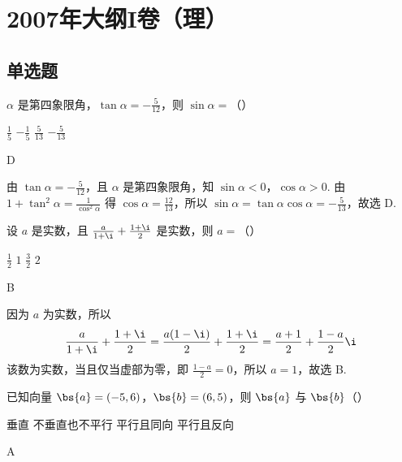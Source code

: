 \chapter{2007年大纲I卷（理）}

\section{单选题}

\begin{problem}
\(\alpha\) 是第四象限角，\(\tan \alpha = -\frac{5}{12}\)，则 \(\sin \alpha =\)（\quad）

\choices
    {\(\frac{1}{5}\)}
    {\(-\frac{1}{5}\)}
    {\(\frac{5}{13}\)}
    {\(-\frac{5}{13}\)}
\end{problem}

\begin{answer}
D
\end{answer}

\begin{solution}
由 \(\tan\alpha=-\frac{5}{12}\)，且 \(\alpha\) 是第四象限角，知 \(\sin\alpha<0\)，\(\cos\alpha>0\). 由 \(1+\tan^2\alpha=\frac{1}{\cos^2\alpha}\) 得 \(\cos\alpha=\frac{12}{13}\)，所以 \(\sin\alpha=\tan\alpha\cos\alpha=-\frac{5}{13}\)，故选 D.
\end{solution}

\begin{problem}
设 \(a\) 是实数，且 \(\frac{a}{1+\i} + \frac{1+\i}{2}\) 是实数，则 \(a =\)（\quad）

\choices
    {\(\frac{1}{2}\)}
    {\(1\)}
    {\(\frac{3}{2}\)}
    {\(2\)}
\end{problem}

\begin{answer}
B
\end{answer}

\begin{solution}
因为 \(a\) 为实数，所以
\[
\frac{a}{1+\i}+\frac{1+\i}{2}=\frac{a(1-\i)}{2}+\frac{1+\i}{2}=\frac{a+1}{2}+\frac{1-a}{2}\i
\]
该数为实数，当且仅当虚部为零，即 \(\frac{1-a}{2}=0\)，所以 \(a=1\)，故选 B.
\end{solution}

\begin{problem}
已知向量 \(\bs{a} = (-5, 6)\)，\(\bs{b} = (6, 5)\)，则 \(\bs{a}\) 与 \(\bs{b}\)（\quad）

\choices
    {垂直}
    {不垂直也不平行}
    {平行且同向}
    {平行且反向}
\end{problem}

\begin{answer}
A
\end{answer}

